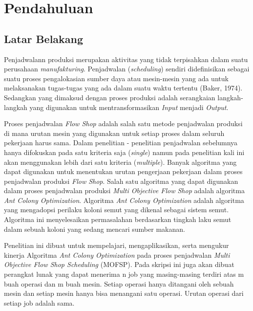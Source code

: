 \chapter{Pendahuluan}
\label{chap:intro}
   
\section{Latar Belakang}
\label{sec:label}

Penjadwalann produksi merupakan aktivitas yang tidak terpisahkan dalam suatu perusahaan {\it manufakturing}. Penjadwalan ({\it scheduling}) sendiri didefinisikan sebagai suatu proses pengalokasian sumber daya atau mesin-mesin yang ada untuk melaksanakan tugas-tugas yang ada dalam suatu waktu tertentu (Baker, 1974). Sedangkan yang dimaksud dengan proses produksi adalah serangkaian langkah-langkah yang digunakan untuk mentransformasikan {\it Input} menjadi {\it Output}.

Proses penjadwalan {\it Flow Shop} adalah salah satu metode penjadwalan produksi di mana urutan mesin yang digunakan untuk setiap proses dalam seluruh pekerjaan harus sama. Dalam penelitian - penelitian penjadwalan sebelumnya hanya difokuskan pada satu kriteria saja ({\it single}) namun pada penelitian kali ini akan menggunakan lebih dari satu kriteria ({\it multiple}). Banyak algoritma yang dapat digunakan untuk menentukan urutan  pengerjaan pekerjaan dalam proses penjadwalan produksi {\it Flow Shop}. Salah satu algoritma yang dapat digunakan dalam proses penjadwalan produksi {\it Multi Objective Flow Shop} adalah algoritma {\it Ant Colony Optimization}. Algoritma {\it Ant Colony Optimization} adalah algoritma yang mengadopsi perilaku koloni semut yang dikenal sebagai sistem semut. Algoritma ini menyelesaikan permasalahan berdasarkan tingkah laku semut dalam sebuah koloni yang sedang mencari sumber makanan.

Penelitian ini dibuat untuk mempelajari, mengaplikasikan, serta mengukur kinerja Algoritma {\it Ant Colony Optimization} pada proses penjadwalan {\it Multi Objective Flow Shop Scheduling} (MOFSP). Pada skripsi ini juga akan dibuat perangkat lunak yang dapat menerima n job yang masing-masing terdiri atas m buah operasi dan m buah mesin. Setiap operasi hanya ditangani oleh sebuah mesin dan setiap mesin hanya bisa menangani satu operasi. Urutan operasi dari setiap job adalah sama.


